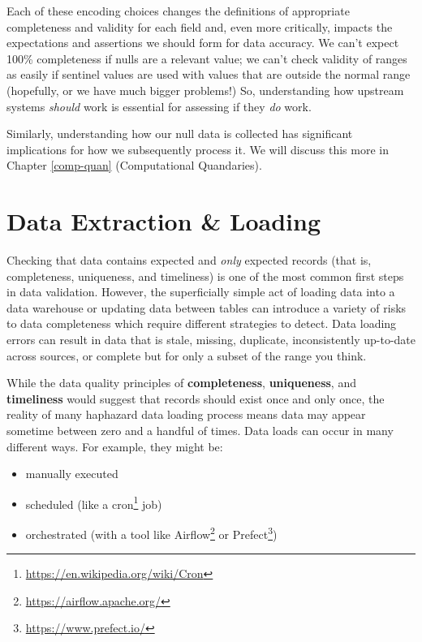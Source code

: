 \documentclass[
]{krantz}
\providecommand{\tightlist}{%
  \setlength{\itemsep}{0pt}\setlength{\parskip}{0pt}}
\renewcommand{\href}[2]{#2\footnote{\url{#1}}}
\begin{document}
Each of these encoding choices changes the definitions of appropriate completeness and validity for each field and, even more critically, impacts the expectations and assertions we should form for data accuracy.
We can't expect 100\% completeness if nulls are a relevant value; we can't check validity of ranges as easily if sentinel values are used with values that are outside the normal range (hopefully, or we have much bigger problems!)
So, understanding how upstream systems \emph{should} work is essential for assessing if they \emph{do} work.

Similarly, understanding how our null data is collected has significant implications for how we subsequently process it. We will discuss this more in Chapter \ref{comp-quan} (Computational Quandaries).

\hypertarget{data-extraction-loading}{%
\section{Data Extraction \& Loading}\label{data-extraction-loading}}

Checking that data contains expected and \emph{only} expected records (that is, completeness, uniqueness, and timeliness) is one of the most common first steps in data validation.
However, the superficially simple act of loading data into a data warehouse or updating data between tables can introduce a variety of risks to data completeness which require different strategies to detect.
Data loading errors can result in data that is stale, missing, duplicate, inconsistently up-to-date across sources, or complete but for only a subset of the range you think.

While the data quality principles of \textbf{completeness}, \textbf{uniqueness}, and \textbf{timeliness} would suggest that records should exist once and only once, the reality of many haphazard data loading process means data may appear sometime between zero and a handful of times. Data loads can occur in many different ways.
For example, they might be:

\begin{itemize}
\tightlist
\item
  manually executed
\item
  scheduled (like a \href{https://en.wikipedia.org/wiki/Cron}{cron} job)
\item
  orchestrated (with a tool like \href{https://airflow.apache.org/}{Airflow} or \href{https://www.prefect.io/}{Prefect})
\end{itemize}
\end{document}

